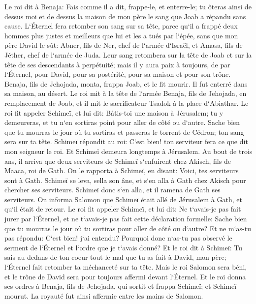 \verse Le roi dit à Benaja: Fais comme il a dit, frappe-le, et enterre-le; tu ôteras ainsi de dessus moi et de dessus la maison de mon père le sang que Joab a répandu sans cause. 
\verse L`Éternel fera retomber son sang sur sa tête, parce qu`il a frappé deux hommes plus justes et meilleurs que lui et les a tués par l`épée, sans que mon père David le sût: Abner, fils de Ner, chef de l`armée d`Israël, et Amasa, fils de Jéther, chef de l`armée de Juda. 
\verse Leur sang retombera sur la tête de Joab et sur la tête de ses descendants à perpétuité; mais il y aura paix à toujours, de par l`Éternel, pour David, pour sa postérité, pour sa maison et pour son trône. 
\verse Benaja, fils de Jehojada, monta, frappa Joab, et le fit mourir. Il fut enterré dans sa maison, au désert. 
\verse Le roi mit à la tête de l`armée Benaja, fils de Jehojada, en remplacement de Joab, et il mit le sacrificateur Tsadok à la place d`Abiathar. 
\verse Le roi fit appeler Schimeï, et lui dit: Bâtis-toi une maison à Jérusalem; tu y demeureras, et tu n`en sortiras point pour aller de côté ou d`autre. 
\verse Sache bien que tu mourras le jour où tu sortiras et passeras le torrent de Cédron; ton sang sera sur ta tête. 
\verse Schimeï répondit au roi: C`est bien! ton serviteur fera ce que dit mon seigneur le roi. Et Schimeï demeura longtemps à Jérusalem. 
\verse Au bout de trois ans, il arriva que deux serviteurs de Schimeï s`enfuirent chez Akisch, fils de Maaca, roi de Gath. On le rapporta à Schimeï, en disant: Voici, tes serviteurs sont à Gath. 
\verse Schimeï se leva, sella son âne, et s`en alla à Gath chez Akisch pour chercher ses serviteurs. Schimeï donc s`en alla, et il ramena de Gath ses serviteurs. 
\verse On informa Salomon que Schimeï était allé de Jérusalem à Gath, et qu`il était de retour. 
\verse Le roi fit appeler Schimeï, et lui dit: Ne t`avais-je pas fait jurer par l`Éternel, et ne t`avais-je pas fait cette déclaration formelle: Sache bien que tu mourras le jour où tu sortiras pour aller de côté ou d`autre? Et ne m`as-tu pas répondu: C`est bien! j`ai entendu? 
\verse Pourquoi donc n`as-tu pas observé le serment de l`Éternel et l`ordre que je t`avais donné? 
\verse Et le roi dit à Schimeï: Tu sais au dedans de ton coeur tout le mal que tu as fait à David, mon père; l`Éternel fait retomber ta méchanceté sur ta tête. 
\verse Mais le roi Salomon sera béni, et le trône de David sera pour toujours affermi devant l`Éternel. 
\verse Et le roi donna ses ordres à Benaja, fils de Jehojada, qui sortit et frappa Schimeï; et Schimeï mourut. La royauté fut ainsi affermie entre les mains de Salomon. 

